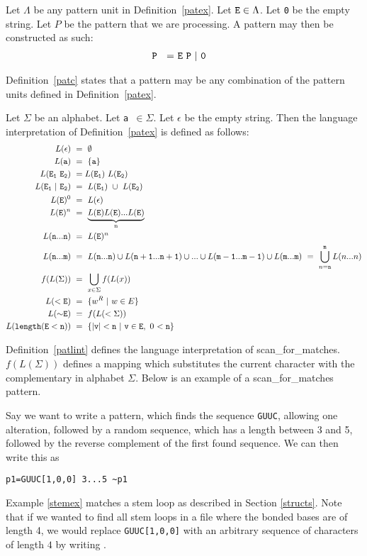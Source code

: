 \begin{mydef}\label{patc}
Let $\Lambda$ be any pattern unit in Definition~\ref{patex}. Let ${\tt E}\in\Lambda$.
Let {\tt 0} be the empty string. Let $P$ be the pattern that we are processing.
A pattern may then be constructed as such: 
\begin{align*}
{\tt P~}~=&~{\tt E~P~|~0}
\end{align*}
\end{mydef}
Definition~\ref{patc} states that a pattern may be any combination of the pattern 
units defined in Definition~\ref{patex}.
\begin{mydef}\label{patlint}
Let $\Sigma$ be an alphabet. Let {\tt a $\in\Sigma$}. Let $\epsilon$ be the empty 
string.
Then the language interpretation of Definition~\ref{patex} is defined as follows:
\begin{align*}
L({\tt \epsilon})~&=~\emptyset\\
L({\tt a})~&=~\{{\tt a}\}\\
L({\tt E_1~E_2})~&=L({\tt E_1})~L({\tt E_2})\\
L({\tt E_1~|~E_2})~&=~L({\tt E}_{\tt 1})~\cup~L({\tt E}_{\tt 2})\\
L({\tt E})^0~&=~L({\tt \epsilon})\\
L({\tt E})^n~&=~\underbrace{L({\tt E})L({\tt E})...L({\tt E})}_\text{n}\\
L({\tt n...n})~&=~L({\tt E})^n\\
L({\tt n...m})~&=~L({\tt n...n})\cup L({\tt n+1...n+1})\cup...\cup L({\tt m-1...m-1})\cup L({\tt m...m})~=~\bigcup\limits_{n={\tt n}}^{\tt m} L(n...n)\\
f(L(\Sigma))~&=~\bigcup\limits_{x\in\Sigma} f(L(x))\\ %
L({\tt <E})~&=~\{w^R~|~w\in E\}\\
L({\tt {\sim}E})~&=~f(L(<\Sigma))\\
L({\tt length(E<n)} )~&=~\{{\tt |v|<n~|~v\in E},~0~{\tt <n}\}
\end{align*}
\end{mydef}
Definition~\ref{patlint} defines the language interpretation of 
scan\_for\_matches. $f(L(\Sigma))$ defines a mapping \cite[p. 60]{Hopcroft1979} 
which substitutes the current character with the complementary in alphabet 
$\Sigma$.
Below is an example of a scan\_for\_matches pattern.
\begin{myex}\label{stemex}
Say we want to write a pattern, which finds the sequence {\tt GUUC}, allowing 
one alteration, followed by a random sequence, which has a length between 3 and 5, 
followed by the reverse complement of the first found sequence. We can 
then write this as \begin{center}
{\tt p1=GUUC[1,0,0] 3...5 \textasciitilde p1}
\end{center}
\end{myex}
Example \ref{stemex} matches a stem loop as described in Section 
\ref{structs}. Note that if we wanted to find all stem loops in a file where 
the bonded bases are of length 
4, we would replace {\tt GUUC[1,0,0]} with an arbitrary sequence of characters of length $4$ 
by writing {}.
